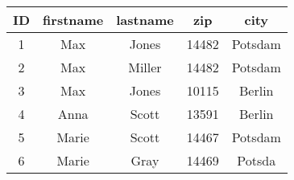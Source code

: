 \documentclass{article}
\begin{document}
\begin{center}
\begin{tabular}{|c|c|c|c|c|}
\hline
ID & firstname & lastname & zip & city \\
\hline
1 & Max & Jones & 14482 & Potsdam \\
\hline
2 & Max & Miller & 14482 & Potsdam \\
\hline
3 & Max & Jones & 10115 & Berlin \\
\hline
4 & Anna & Scott & 13591 & Berlin \\
\hline
5 & Marie & Scott & 14467 & Potsdam \\
\hline
6 & Marie & Gray & 14469 & Potsda \\
\hline
\end{tabular}
\end{center}
\end{document}
